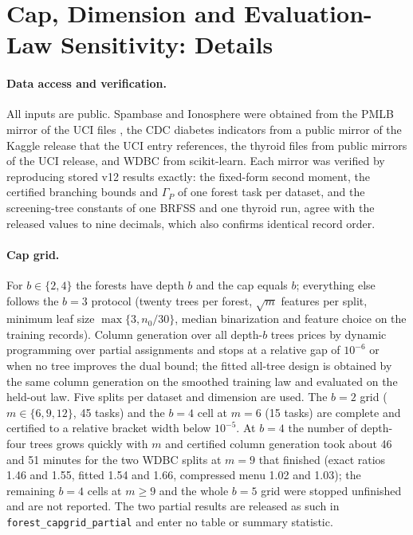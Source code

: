 \section{Cap, Dimension and Evaluation-Law Sensitivity: Details}\label{app:capsens}
\paragraph{Data access and verification.}
All inputs are public. Spambase and Ionosphere were obtained from the PMLB mirror of the UCI files \citep{romano2021pmlb}, the CDC diabetes indicators from a public mirror of the Kaggle release that the UCI entry references, the thyroid files from public mirrors of the UCI release, and WDBC from scikit-learn. Each mirror was verified by reproducing stored v12 results exactly: the fixed-form second moment, the certified branching bounds and $\Gamma_P$ of one forest task per dataset, and the screening-tree constants of one BRFSS and one thyroid run, agree with the released values to nine decimals, which also confirms identical record order.

\paragraph{Cap grid.}
For $b\in\{2,4\}$ the forests have depth $b$ and the cap equals $b$; everything else follows the $b=3$ protocol (twenty trees per forest, $\sqrt m$ features per split, minimum leaf size $\max\{3,n_0/30\}$, median binarization and feature choice on the training records). Column generation over all depth-$b$ trees prices by dynamic programming over partial assignments and stops at a relative gap of $10^{-6}$ or when no tree improves the dual bound; the fitted all-tree design is obtained by the same column generation on the smoothed training law and evaluated on the held-out law. Five splits per dataset and dimension are used. The $b=2$ grid ($m\in\{6,9,12\}$, 45 tasks) and the $b=4$ cell at $m=6$ (15 tasks) are complete and certified to a relative bracket width below $10^{-5}$. At $b=4$ the number of depth-four trees grows quickly with $m$ and certified column generation took about 46 and 51 minutes for the two WDBC splits at $m=9$ that finished (exact ratios 1.46 and 1.55, fitted 1.54 and 1.66, compressed menu 1.02 and 1.03); the remaining $b=4$ cells at $m\ge9$ and the whole $b=5$ grid were stopped unfinished and are not reported. The two partial results are released as such in \texttt{forest\_capgrid\_partial} and enter no table or summary statistic.


